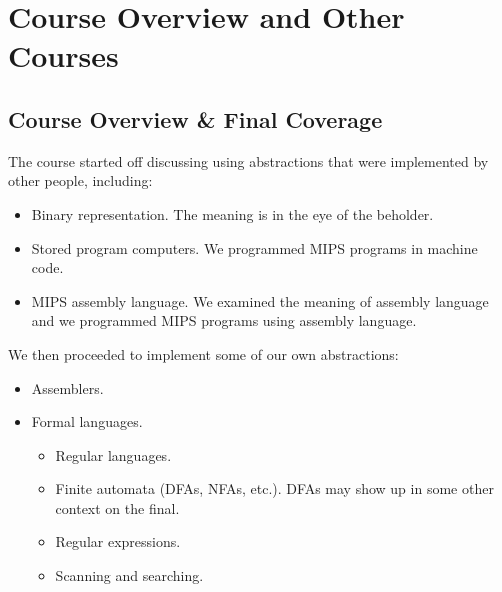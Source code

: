 \documentclass[]{article}
\theoremstyle{definition}
\newcommand{\lecture}[1]{\marginpar{{\footnotesize $\leftarrow$ \underline{#1}}}}
\begin{document}
	\section{Course Overview and Other Courses} \lecture{April 8, 2013}
		\subsection{Course Overview \& Final Coverage}
			The course started off discussing using abstractions that were implemented by other people, including:
			\begin{itemize}
				\item Binary representation. The meaning is in the eye of the beholder.
				\item Stored program computers. We programmed MIPS programs in machine code.
				\item MIPS assembly language. We examined the meaning of assembly language and we programmed MIPS programs using assembly language.
			\end{itemize}
		
			We then proceeded to implement some of our own abstractions:
			\begin{itemize}
				\item Assemblers.
				\item Formal languages.
					\begin{itemize}
						\item Regular languages.
						\item Finite automata (DFAs, NFAs, etc.). DFAs may show up in some other context on the final.
						\item Regular expressions.
						\item Scanning and searching.
					\end{itemize}
			\end{itemize}
		
\end{document}
